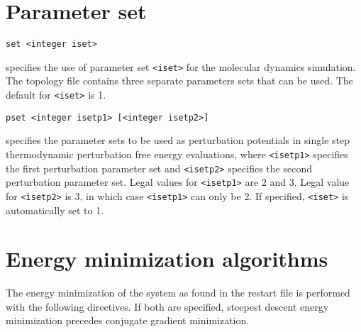 \section{Parameter set}
\begin{description}

\item
\begin{verbatim}
set <integer iset>
\end{verbatim}
specifies the use of parameter set \verb+<iset>+ for the 
molecular dynamics simulation. 
The topology file contains three separate parameters sets that can 
be used. The default for \verb+<iset>+ is 1.

\item
\begin{verbatim}
pset <integer isetp1> [<integer isetp2>]
\end{verbatim}
specifies the parameter sets to be used as perturbation potentials
in single step thermodynamic perturbation free energy evaluations,
where \verb+<isetp1>+ specifies the first perturbation parameter set and
\verb+<isetp2>+ specifies the second perturbation parameter set. Legal
values for \verb+<isetp1>+ are 2 and 3. Legal value for \verb+<isetp2>+ is
3, in which case \verb+<isetp1>+ can only be 2. If specified, \verb+<iset>+
is automatically set to 1.
\end{description}

\section{Energy minimization algorithms}
The energy minimization of the system as found in the restart file 
is performed with the following directives. If both are specified,
steepest descent energy minimization precedes conjugate gradient 
minimization.

